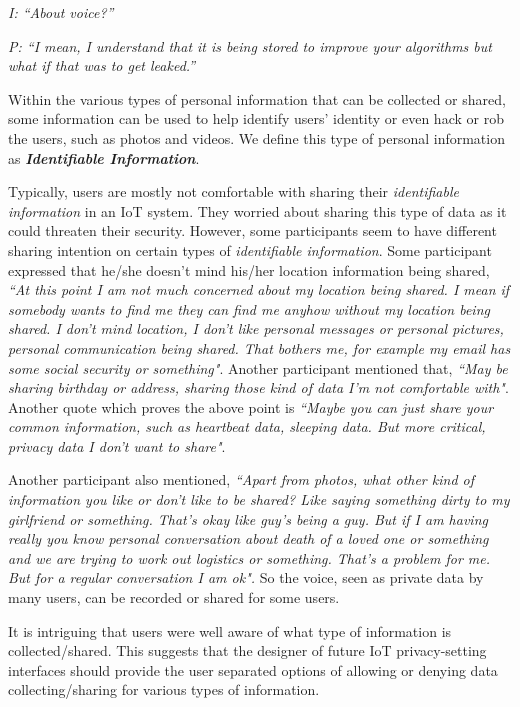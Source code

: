 \textit{I: ``About voice?''\\}

\textit{P: ``I mean, I understand that it is being stored to improve your algorithms but what if that was to get leaked.''\\}

Within the various types of personal information that can be collected or shared, some information can be used to help identify users' identity or even hack or rob the users, such as photos and videos. We define this type of personal information as \textbf{\textit{Identifiable Information}}.

Typically, users are mostly not comfortable with sharing their \textit{identifiable information} in an IoT system. They worried about sharing this type of data as it could threaten their security. However, some participants seem to have different sharing intention on certain types of \textit{identifiable information}. Some participant expressed that he/she doesn't mind his/her location information being shared, \textit{``At this point I am not much concerned about my location being shared. I mean if somebody wants to find me they can find me anyhow without my location being shared. I don't mind location, I don't like personal messages or personal pictures, personal communication being shared. That bothers me, for example my email has some social security or something"}. Another participant mentioned that, \textit{``May be sharing birthday or address, sharing those kind of data I'm not comfortable with"}. Another quote which proves the above point is \textit{``Maybe you can just share your common information, such as heartbeat data, sleeping data. But more critical, privacy data I don't want to share"}.

Another participant also mentioned, \textit {``Apart from photos, what other kind of information you like or don't like to be shared? Like saying something dirty to my girlfriend or something. That's okay like guy's being a guy. But if I am having really you know personal conversation about death of a loved one or something and we are trying to work out logistics or something. That's a problem for me. But for a regular conversation I am ok".} So the voice, seen as private data by many users, can be recorded or shared for some users.

It is intriguing that users were well aware of what type of information is collected/shared. This suggests that the designer of future IoT privacy-setting interfaces should provide the user separated options of allowing or denying data collecting/sharing for various types of information.

